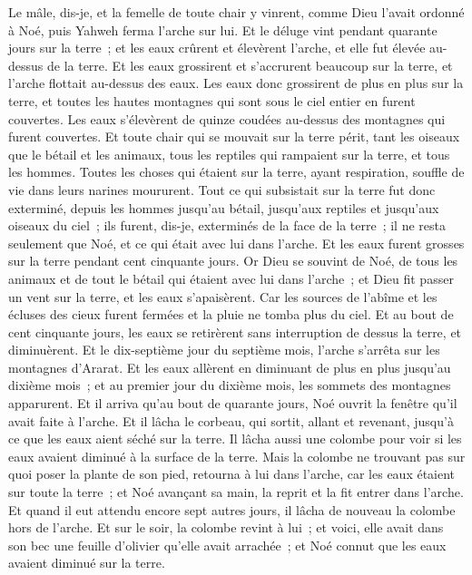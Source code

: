 \begin{multicols}{2}
Le mâle, dis-je, et la femelle de toute chair y vinrent, comme Dieu l'avait ordonné à Noé, puis Yahweh ferma l'arche sur lui.
Et le déluge vint pendant quarante jours sur la terre~; et les eaux crûrent et élevèrent l'arche, et elle fut élevée au-dessus de la terre.
Et les eaux grossirent et s'accrurent beaucoup sur la terre, et l'arche flottait au-dessus des eaux.
Les eaux donc grossirent de plus en plus sur la terre, et toutes les hautes montagnes qui sont sous le ciel entier en furent couvertes.
Les eaux s'élevèrent de quinze coudées au-dessus des montagnes qui furent couvertes.
Et toute chair qui se mouvait sur la terre périt, tant les oiseaux que le bétail et les animaux, tous les reptiles qui rampaient sur la terre, et tous les hommes.
Toutes les choses qui étaient sur la terre, ayant respiration, souffle de vie dans leurs narines moururent.
Tout ce qui subsistait sur la terre fut donc exterminé, depuis les hommes jusqu'au bétail, jusqu'aux reptiles et jusqu'aux oiseaux du ciel~; ils furent, dis-je, exterminés de la face de la terre~; il ne resta seulement que Noé, et ce qui était avec lui dans l'arche.
Et les eaux furent grosses sur la terre pendant cent cinquante jours.
\VerseOne{}Or Dieu se souvint de Noé, de tous les animaux et de tout le bétail qui étaient avec lui dans l'arche~; et Dieu fit passer un vent sur la terre, et les eaux s'apaisèrent.
Car les sources de l'abîme et les écluses des cieux furent fermées et la pluie ne tomba plus du ciel.
Et au bout de cent cinquante jours, les eaux se retirèrent sans interruption de dessus la terre, et diminuèrent.
Et le dix-septième jour du septième mois, l'arche s'arrêta sur les montagnes d'Ararat.
Et les eaux allèrent en diminuant de plus en plus jusqu'au dixième mois~; et au premier jour du dixième mois, les sommets des montagnes apparurent.
Et il arriva qu'au bout de quarante jours, Noé ouvrit la fenêtre qu'il avait faite à l'arche.
Et il lâcha le corbeau, qui sortit, allant et revenant, jusqu'à ce que les eaux aient séché sur la terre.
Il lâcha aussi une colombe pour voir si les eaux avaient diminué à la surface de la terre.
Mais la colombe ne trouvant pas sur quoi poser la plante de son pied, retourna à lui dans l'arche, car les eaux étaient sur toute la terre~; et Noé avançant sa main, la reprit et la fit entrer dans l'arche.
Et quand il eut attendu encore sept autres jours, il lâcha de nouveau la colombe hors de l'arche.
Et sur le soir, la colombe revint à lui~; et voici, elle avait dans son bec une feuille d'olivier qu'elle avait arrachée~; et Noé connut que les eaux avaient diminué sur la terre.

\end{multicols}
